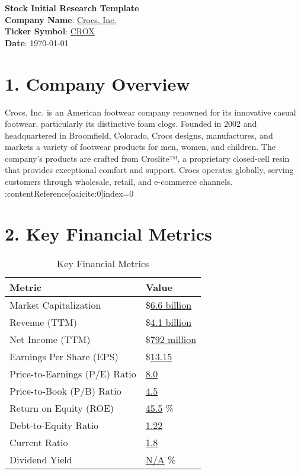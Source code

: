 \documentclass[12pt]{article}
\begin{document}
\begin{center}
    {\Large \textbf{Stock Initial Research Template}}\\[1.5em]
    \textbf{Company Name}: \underline{Crocs, Inc.}\\[0.5em]
    \textbf{Ticker Symbol}: \underline{CROX}\\[0.5em]
    \textbf{Date}: \today
\end{center}

\vspace{1em}

\section*{1. Company Overview}
Crocs, Inc. is an American footwear company renowned for its innovative casual footwear, particularly its distinctive foam clogs. Founded in 2002 and headquartered in Broomfield, Colorado, Crocs designs, manufactures, and markets a variety of footwear products for men, women, and children. The company's products are crafted from Croslite™, a proprietary closed-cell resin that provides exceptional comfort and support. Crocs operates globally, serving customers through wholesale, retail, and e-commerce channels. :contentReference[oaicite:0]{index=0}

\section*{2. Key Financial Metrics}
\begin{table}[H]
    \centering
    \begin{tabular}{@{}ll@{}}
        \toprule
        \textbf{Metric}                 & \textbf{Value}                    \\
        \midrule
        Market Capitalization           & \$\underline{6.6 billion}         \\
        Revenue (TTM)                   & \$\underline{4.1 billion}         \\
        Net Income (TTM)                & \$\underline{792 million}         \\
        Earnings Per Share (EPS)        & \$\underline{13.15}               \\
        Price-to-Earnings (P/E) Ratio   & \underline{8.0}                   \\
        Price-to-Book (P/B) Ratio       & \underline{4.5}                   \\
        Return on Equity (ROE)          & \underline{45.5} \%               \\
        Debt-to-Equity Ratio            & \underline{1.22}                  \\
        Current Ratio                   & \underline{1.8}                   \\
        Dividend Yield                  & \underline{N/A} \%                \\
        \bottomrule
    \end{tabular}
    \caption{Key Financial Metrics}
\end{table}
\end{document}
